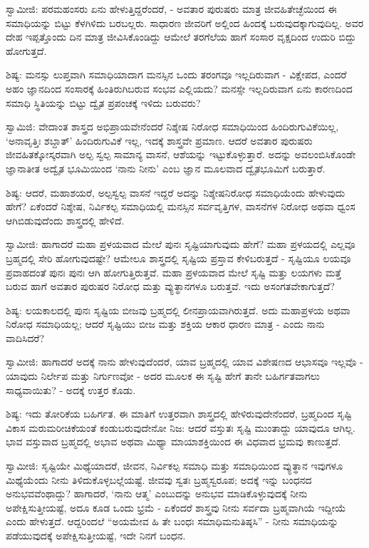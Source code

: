 ಸ್ವಾಮೀಜಿ: ಪರಮಹಂಸರು ಏನು ಹೇಳುತ್ತಿದ್ದರೆಂದರೆ, - ಅವತಾರ ಪುರುಷರು ಮಾತ್ರ ಜೀವಹಿತೇಚ್ಛೆಯಿಂದ ಈ ಸಮಾಧಿಯನ್ನು ಬಿಟ್ಟು ಕೆಳಗಿಳಿದು ಬರಬಲ್ಲರು. ಸಾಧಾರಣ ಜೀವರಿಗೆ ಅಲ್ಲಿಂದ ಹಿಂದಕ್ಕೆ ಬರುವುದಕ್ಕಾಗುವುದಿಲ್ಲ. ಅವರ ದೇಹ ಇಪ್ಪತ್ತೊಂದು ದಿನ ಮಾತ್ರ ಜೀವಿಸಿಕೊಂಡಿದ್ದು ಆಮೇಲೆ ತರಗೆಲೆಯ ಹಾಗೆ ಸಂಸಾರ ವೃಕ್ಷದಿಂದ ಉದುರಿ ಬಿದ್ದು ಹೋಗುತ್ತದೆ.

ಶಿಷ್ಯ: ಮನಸ್ಸು ಲುಪ್ತವಾಗಿ ಸಮಾಧಿಯಾದಾಗ ಮನಸ್ಸಿನ ಒಂದು ತರಂಗವೂ ಇಲ್ಲದಿರುವಾಗ - ವಿಕ್ಷೇಪದ, ಎಂದರೆ ಅಹಂ ಜ್ಞಾನದಿಂದ ಸಂಸಾರಕ್ಕೆ ಹಿಂತಿರುಗಿಬರುವ ಸಂಭವ ಎಲ್ಲಿಯದು? ಮನಸ್ಸೇ ಇಲ್ಲದಿರುವಾಗ ಏನು ಕಾರಣದಿಂದ ಸಮಾಧಿ ಸ್ಥಿತಿಯನ್ನು ಬಿಟ್ಟು ದ್ವೈತ ಪ್ರಪಂಚಕ್ಕೆ ಇಳಿದು ಬರುವರು?

ಸ್ವಾಮಿಜಿ: ವೇದಾಂತ ಶಾಸ್ತ್ರದ ಅಭಿಪ್ರಾಯವೇನೆಂದರೆ ನಿಶ್ಶೇಷ ನಿರೋಧ ಸಮಾಧಿಯಿಂದ ಹಿಂದಿರುಗುವಿಕೆಯಿಲ್ಲ, ‘ಅನಾವೃತ್ತಿಃ ಶಬ್ದಾತ್’ ಹಿಂದಿರುಗುವಿಕೆ ಇಲ್ಲ, ಇದಕ್ಕೆ ಶಾಸ್ತ್ರವೇ ಪ್ರಮಾಣ. ಆದರೆ ಅವತಾರ ಪುರುಷರು ಜೀವಹಿತಕ್ಕೋಸ್ಕರವಾಗಿ ಅಲ್ಪ ಸ್ವಲ್ಪ ಸಾಮಾನ್ಯ ವಾಸನೆ, ಆಶೆಯನ್ನು ಇಟ್ಟುಕೊಳ್ಳುತ್ತಾರೆ. ಅದನ್ನು ಅವಲಂಬಿಸಿಕೊಂಡೇ ಜ್ಞಾನಾತೀತ ಅದ್ವೈತ ಭೂಮಿಯಿಂದ ‘ನಾನು ನೀನು’ ಎಂಬ ಜ್ಞಾನ ಮೂಲವಾದ ದ್ವೈತಭೂಮಿಗೆ ಬರುತ್ತಾರೆ.

ಶಿಷ್ಯ: ಆದರೆ, ಮಹಾಶಯರೆ, ಅಲ್ಪಸ್ವಲ್ಪ ವಾಸನೆ ಇದ್ದರೆ ಅದನ್ನು ನಿಶ್ಶೇಷನಿರೋಧ ಸಮಾಧಿಯೆಂದು ಹೇಳುವುದು ಹೇಗೆ? ಏಕೆಂದರೆ ನಿಶ್ಶೇಷ, ನಿರ್ವಿಕಲ್ಪ ಸಮಾಧಿಯಲ್ಲಿ ಮನಸ್ಸಿನ ಸರ್ವವೃತ್ತಿಗಳ, ವಾಸನೆಗಳ ನಿರೋಧ ಅಥವಾ ಧ್ವಂಸ ಆಗಿಬಿಡುವುದೆಂದು ಶಾಸ್ತ್ರದಲ್ಲಿ ಹೇಳಿದೆ.

ಸ್ವಾಮೀಜಿ: ಹಾಗಾದರೆ ಮಹಾ ಪ್ರಳಯವಾದ ಮೇಲೆ ಪುನಃ ಸೃಷ್ಟಿಯಾಗುವುದು ಹೇಗೆ? ಮಹಾ ಪ್ರಳಯದಲ್ಲಿ ಎಲ್ಲವೂ ಬ್ರಹ್ಮದಲ್ಲಿ ಸೇರಿ ಹೋಗುವುದಷ್ಟೇ? ಆಮೇಲೂ ಶಾಸ್ತ್ರದಲ್ಲಿ ಸೃಷ್ಟಿಯ ಪ್ರಸ್ತಾವ ಕೇಳಿಬರುತ್ತದೆ - ಸೃಷ್ಟಿಯೂ ಲಯವೂ ಪ್ರವಾಹದಂತೆ ಪುನಃ ಪುನಃ ಆಗಿ ಹೋಗುತ್ತಿರುತ್ತವೆ. ಮಹಾ ಪ್ರಳಯವಾದ ಮೇಲೆ ಸೃಷ್ಟಿ ಮತ್ತು ಲಯಗಳು ಮತ್ತೆ ಬರುವ ಹಾಗೆ ಅವತಾರ ಪುರುಷರ ನಿರೋಧ ಮತ್ತು ವ್ಯುತ್ಥಾನಗಳೂ ಬರುತ್ತವೆ. ಇದು ಅಸಂಗತವೇಕಾಗುತ್ತದೆ?

ಶಿಷ್ಯ: ಲಯಕಾಲದಲ್ಲಿ ಪುನಃ ಸೃಷ್ಟಿಯ ಬೀಜವು ಬ್ರಹ್ಮದಲ್ಲಿ ಲೀನಪ್ರಾಯವಾಗಿರುತ್ತದೆ. ಅದು ಮಹಾಪ್ರಳಯ ಅಥವಾ ನಿರೋಧ ಸಮಾಧಿಯಲ್ಲ; ಆದರೆ ಸೃಷ್ಟಿಯು ಬೀಜ ಮತ್ತು ಶಕ್ತಿಯ ಆಕಾರ ಧಾರಣ ಮಾತ್ರ - ಎಂದು ನಾನು ವಾದಿಸಿದರೆ?

ಸ್ವಾಮೀಜಿ: ಹಾಗಾದರೆ ಅದಕ್ಕೆ ನಾನು ಹೇಳುವುದೆಂದರೆ, ಯಾವ ಬ್ರಹ್ಮದಲ್ಲಿ ಯಾವ ವಿಶೇಷಣದ ಆಭಾಸವೂ ಇಲ್ಲವೊ - ಯಾವುದು ನಿರ್ಲೇಪ ಮತ್ತು ನಿರ್ಗುಣವೋ - ಅದರ ಮೂಲಕ ಈ ಸೃಷ್ಟಿ ಹೇಗೆ ತಾನೇ ಬಹಿರ್ಗತವಾಗಲು ಸಾಧ್ಯವಾಯಿತು? - ಅದಕ್ಕೆ ಉತ್ತರ ಕೊಡು.

ಶಿಷ್ಯ: ಇದು ತೋರಿಕೆಯ ಬಹಿರ್ಗತ. ಈ ಮಾತಿಗೆ ಉತ್ತರವಾಗಿ ಶಾಸ್ತ್ರದಲ್ಲಿ ಹೇಳಿರುವುದೇನೆಂದರೆ, ಬ್ರಹ್ಮದಿಂದ ಸೃಷ್ಟಿ ವಿಕಾಸ ಮರುಮರೀಚಿಕೆಯಂತೆ ಕಂಡುಬರುವುದೇನೋ ನಿಜ: ಆದರೆ ವಸ್ತುತಃ ಸೃಷ್ಟಿ ಮುಂತಾದ್ದು ಯಾವುದೂ ಆಗಿಲ್ಲ. ಭಾವ ವಸ್ತುವಾದ ಬ್ರಹ್ಮದಲ್ಲಿ ಅಭಾವ ಅಥವಾ ಮಿಥ್ಯಾ ಮಾಯಾಶಕ್ತಿಯಿಂದ ಈ ವಿಧವಾದ ಭ್ರಮವು ಕಾಣುತ್ತದೆ.

ಸ್ವಾಮೀಜಿ: ಸೃಷ್ಟಿಯೇ ಮಿಥ್ಯೆಯಾದರೆ, ಜೀವನ, ನಿರ್ವಿಕಲ್ಪ ಸಮಾಧಿ ಮತ್ತು ಸಮಾಧಿಯಿಂದ ವ್ಯುತ್ಥಾನ ಇವುಗಳೂ ಮಿಥ್ಯೆಯೆಂದು ನೀನು ತಿಳಿದುಕೊಳ್ಳಬಲ್ಲೆಯಷ್ಟೆ. ಜೀವವು ಸ್ವತಃ ಬ್ರಹ್ಮಸ್ವರೂಪ; ಅದಕ್ಕೆ ಇನ್ನು ಬಂಧನದ ಅನುಭವವೆಂಥಾದ್ದು? ಹಾಗಾದರೆ, ‘ನಾನು ಆತ್ಮ’ ಎಂಬುದನ್ನು ಅನುಭವ ಮಾಡಿಕೊಳ್ಳುವುದಕ್ಕೆ ನೀನು ಅಪೇಕ್ಷಿಸುತ್ತೀಯಷ್ಟೆ, ಅದೂ ಕೂಡ ಒಂದು ಭ್ರಮೆ - ಏಕೆಂದರೆ ಶಾಸ್ತ್ರವು ನೀನು ಸರ್ವದಾ ಬ್ರಹ್ಮವಾಗಿಯೆ ಇದ್ದೀಯೆ ಎಂದು ಹೇಳುತ್ತದೆ. ಆದ್ದರಿಂದಲೆ “ಅಯಮೇವ ಹಿ ತೇ ಬಂಧಃ ಸಮಾಧಿಮನುತಿಷ್ಠಸಿ” - ನೀನು ಸಮಾಧಿಯನ್ನು ಪಡೆಯುವುದಕ್ಕೆ ಅಪೇಕ್ಷಿಸುತ್ತೀಯಷ್ಟೆ, ಇದೇ ನಿನಗೆ ಬಂಧನ.

